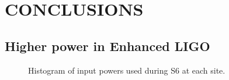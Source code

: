 \chapter{CONCLUSIONS}


\section{Higher power in Enhanced LIGO}

\begin{figure}
\begin{centering}
\caption[Histogram of input powers used during S6]{Histogram of input
  powers used during S6 at each site.}
\label{fig:S6pwrs}
\end{centering}
\end{figure}


